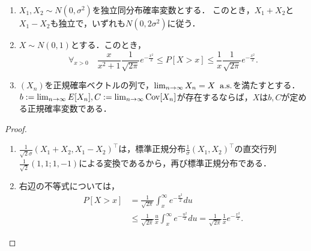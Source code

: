 \documentclass[uplatex,dvipdfmx]{jsreport}
\begin{document}
\begin{lemma}\mbox{}
    \begin{enumerate}
        \item $X_1,X_2\sim N(0,\sigma^2)$を独立同分布確率変数とする．
        このとき，$X_1+X_2$と$X_1-X_2$も独立で，いずれも$N(0,2\sigma^2)$に従う．
        \item $X\sim N(0,1)$とする．このとき，
        \[\forall_{x>0}\quad\frac{x}{x^2+1}\frac{1}{\sqrt{2\pi}}e^{-\frac{x^2}{2}}\le P[X>x]\le\frac{1}{x}\frac{1}{\sqrt{2\pi}}e^{-\frac{x^2}{2}}.\]
        \item $(X_n)$を正規確率ベクトルの列で，$\lim_{n\to\infty}X_n=X\;\;\mathrm{a.s.}$を満たすとする．$b:=\lim_{n\to\infty}E[X_n],C:=\lim_{n\to\infty}\mathrm{Cov}[X_n]$が存在するならば，$X$は$b,C$が定める正規確率変数である．
    \end{enumerate}
\end{lemma}
\begin{proof}\mbox{}
    \begin{enumerate}
        \item $\frac{1}{\sqrt{2}\sigma}(X_1+X_2,X_1-X_2)^\top$は，標準正規分布$\frac{1}{\sigma}(X_1,X_2)^\top$の直交行列$\frac{1}{\sqrt{2}}(1,1;1,-1)$による変換であるから，再び標準正規分布である．
        \item 右辺の不等式については，
        \begin{align*}
            P[X>x]&=\frac{1}{\sqrt{2\pi}}\int^\infty_xe^{-\frac{u^2}{2}}du\\
            &\le\frac{1}{\sqrt{2\pi}}\frac{u}{x}\int^\infty_xe^{-\frac{u^2}{2}}du
            =\frac{1}{\sqrt{2\pi}}\frac{1}{x}e^{-\frac{x^2}{2}}.
        \end{align*}
    \end{enumerate}
\end{proof}
\end{document}

